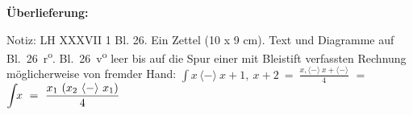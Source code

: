 %
%
%
\begin{ledgroupsized}[r]{120mm}
\footnotesize
\pstart
\noindent\textbf{Überlieferung:}
\pend
\end{ledgroupsized}
\begin{ledgroupsized}[r]{114mm}
\footnotesize
\pstart \parindent -6mm
%
Notiz: LH XXXVII 1 Bl. 26.
Ein Zettel (10 x 9 cm).
Text und Diagramme auf Bl.~26~r\textsuperscript{o}.
Bl.~26~v\textsuperscript{o} leer
bis auf die Spur einer mit Bleistift verfassten Rechnung möglicherweise von fremder Hand:
\newline%
\hspace*{25mm}%
$\displaystyle\int\! x \, \langle-\rangle \ x + 1,\ x + 2 \ = \ \frac{x, \langle-\rangle\ x + \langle-\rangle}{4}$
\newline%
\hspace*{25mm}%
\hspace*{6,6mm} $=$
\newline%
\hspace*{25mm}%
$\displaystyle\int\!\! x\ =\ \frac{x\textsubscript{1} \ (x\textsubscript{2}\ \langle-\rangle\ x\textsubscript{1})}{4}$

\end{ledgroupsized}
